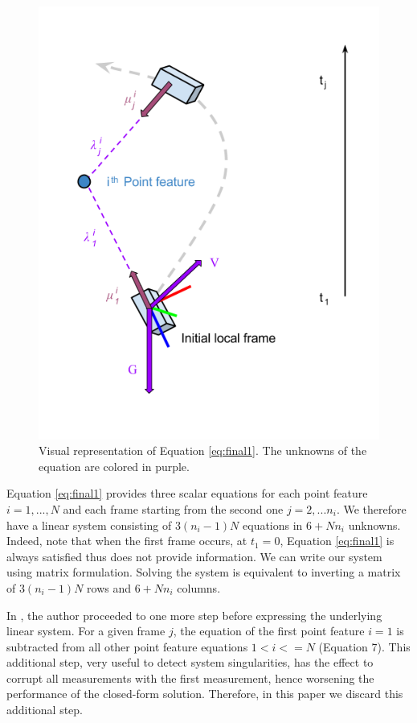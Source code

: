 \documentclass[letterpaper, 10 pt, conference]{ieeeconf}  %
\begin{document}
\begin{figure}
  \centering
  \includegraphics[width=0.7\columnwidth, trim={0 2cm 0 0}, clip]{images/closedFormExplained}
  \caption{Visual representation of Equation \ref{eq:final1}.
  The unknowns of the equation are colored in \textcolor{amethyst}{purple}.}
\end{figure}

Equation \ref{eq:final1} provides three scalar equations for each point feature $i=1,...,N$ and each frame starting from the second one $j=2,...n_i$.
We therefore have a linear system consisting of $3(n_i-1)N$ equations in $6 + Nn_i$ unknowns.
Indeed, note that when the first frame occurs, at $t_1 = 0$,
Equation \ref{eq:final1} is always satisfied thus does not provide information.
We can write our system using matrix formulation.
Solving the system is equivalent to inverting a matrix of $3(n_i-1)N$ rows and $6+Nn_i$ columns.

In \cite{Martinelli2014}, the author proceeded to one more step before expressing the underlying linear system.
For a given frame $j$, the equation of the first point feature $i=1$ is subtracted from all other point feature equations $1<i<=N$ (Equation 7).
This additional step, very useful to detect system singularities, has the effect to corrupt all measurements with the first measurement,
hence worsening the performance of the closed-form solution. Therefore,
in this paper we discard this additional step.
\end{document}

